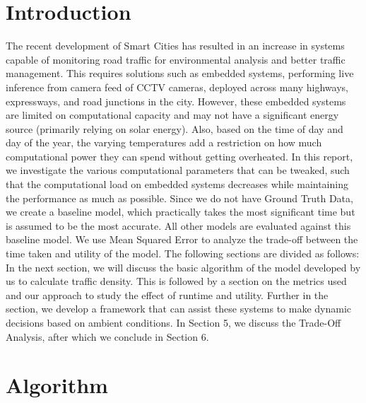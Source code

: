 \documentclass[conference]{IEEEtran}
\begin{document}
\section{Introduction}
The recent development of Smart Cities has resulted in an increase in systems capable of monitoring
road traffic for environmental analysis and better traffic management. This requires solutions such as embedded systems,
performing live inference from camera feed of CCTV cameras, deployed across many highways, expressways, and road junctions in the city.
However, these embedded systems are limited on computational capacity and may not have a significant energy source (primarily relying on solar energy).
Also, based on the time of day and day of the year, the varying temperatures add a restriction on how much computational power they can spend without getting overheated.
In this report, we investigate the various computational parameters that can be tweaked, such that the computational load on embedded systems decreases while maintaining
the performance as much as possible. Since we do not have Ground Truth Data,  we create a baseline model, which practically takes the most significant time but is assumed to be the most accurate.
All other models are evaluated against this baseline model. We use Mean Squared Error to analyze the trade-off between the time taken and utility of the model.
The following sections are divided as follows:
In the next section, we will discuss the basic algorithm of the model developed by us to calculate traffic density. This is followed by a section on the metrics used and our
approach to study the effect of runtime and utility. Further in the section, we develop a framework that can assist these systems to make dynamic decisions based on ambient conditions.
In Section 5, we discuss the Trade-Off Analysis, after which we conclude in Section 6.




\section{Algorithm}
    
\end{document}
